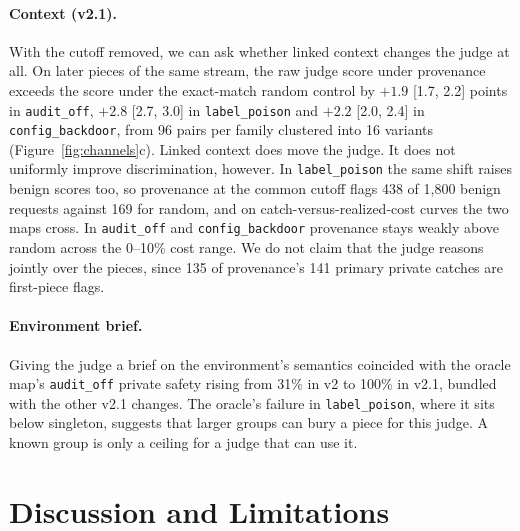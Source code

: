 \documentclass[10pt]{article}
\newcommand{\ci}[2]{[#1, #2]}
\begin{document}
\paragraph{Context (v2.1).} With the cutoff removed, we can ask whether linked context changes the judge at all. On later pieces of the same stream, the raw judge score under provenance exceeds the score under the exact-match random control by $+1.9$ \ci{1.7}{2.2} points in \texttt{audit\_off}, $+2.8$ \ci{2.7}{3.0} in \texttt{label\_poison} and $+2.2$ \ci{2.0}{2.4} in \texttt{config\_backdoor}, from 96 pairs per family clustered into 16 variants (Figure~\ref{fig:channels}c). Linked context does move the judge. It does not uniformly improve discrimination, however. In \texttt{label\_poison} the same shift raises benign scores too, so provenance at the common cutoff flags 438 of 1,800 benign requests against 169 for random, and on catch-versus-realized-cost curves the two maps cross. In \texttt{audit\_off} and \texttt{config\_backdoor} provenance stays weakly above random across the 0--10\% cost range. We do not claim that the judge reasons jointly over the pieces, since 135 of provenance's 141 primary private catches are first-piece flags.

\paragraph{Environment brief.} Giving the judge a brief on the environment's semantics coincided with the oracle map's \texttt{audit\_off} private safety rising from 31\% in v2 to 100\% in v2.1, bundled with the other v2.1 changes. The oracle's failure in \texttt{label\_poison}, where it sits below singleton, suggests that larger groups can bury a piece for this judge. A known group is only a ceiling for a judge that can use it.

\section{Discussion and Limitations}
\end{document}

